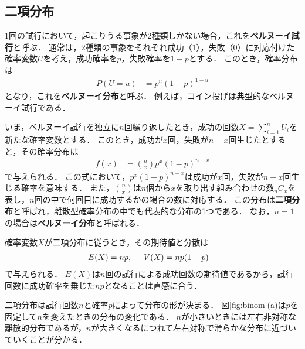\subsection{二項分布}
%
1回の試行において，起こりうる事象が2種類しかない場合，これを\textbf{ベルヌーイ試行}と呼ぶ．
%
通常は，2種類の事象をそれぞれ成功（1），失敗（0）に対応付けた確率変数$ U $を考え，成功確率を$ p $，失敗確率を$ 1-p $とする．
%
このとき，確率分布は
%
\begin{align*}
	P(U=u) &= p^{u}(1-p)^{1-u} 
\end{align*}
%
となり，これを\textbf{ベルヌーイ分布}と呼ぶ．
%
例えば，コイン投げは典型的なベルヌーイ試行である．
%

%
いま，ベルヌーイ試行を独立に$ n $回繰り返したとき，成功の回数$ X=\displaystyle\sum_{i=1}^{n} U_{i} $を新たな確率変数とする．
%
このとき，成功が$ x $回，失敗が$ n-x $回生じたとすると，その確率分布は
%
\begin{align}
	f(x) &= \binom{n}{x}p^{x}(1-p)^{n-x}
	\label{eq:binom}
\end{align}
%
で与えられる．
%
この式において，$ p^{x}(1-p)^{n-x} $は成功が$ x $回，失敗が$ n-x $回生じる確率を意味する．
%
また，$ \binom{n}{x} $は$ n $個から$ x $を取り出す組み合わせの数$ _{n}C_{x} $を表し，$ n $回の中で何回目に成功するかの場合の数に対応する．
%
この分布は\textbf{二項分布}と呼ばれ，離散型確率分布の中でも代表的な分布の1つである．
%
なお，$ n=1 $の場合は\textbf{ベルヌーイ分布}と呼ばれる．
%

%
確率変数$ X $が二項分布に従うとき，その期待値と分散は
%
\begin{align*}
	E(X) &= np, \hspace{0.5cm} V(X) = np(1-p)
\end{align*}
%
で与えられる．
%
$ E(X) $は$ n $回の試行による成功回数の期待値であるから，試行回数に成功確率を乗じた$ np $となることは直感に合う．
%

%
二項分布は試行回数$ n $と確率$ p $によって分布の形が決まる．
%
図\ref{fig:binom}(a)は$ p $を固定して$ n $を変えたときの分布の変化である．
%
$ n $が小さいときには左右非対称な離散的分布であるが，$ n $が大きくなるにつれて左右対称で滑らかな分布に近づいていくことが分かる．
%

